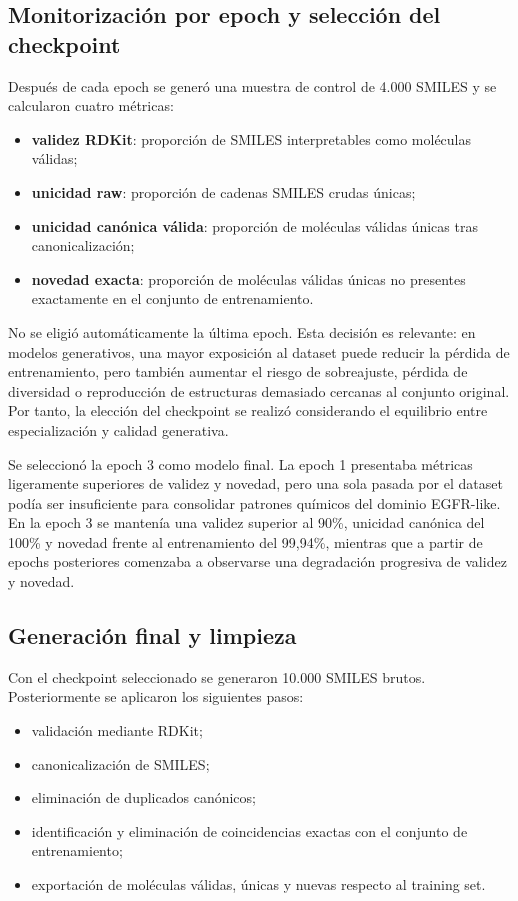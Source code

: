 \documentclass[IB]{TFUOC}%
\begin{document}
\subsection{Monitorización por epoch y selección del checkpoint}

Después de cada epoch se generó una muestra de control de 4.000 SMILES y se calcularon cuatro métricas:

\begin{itemize}
    \item \textbf{validez RDKit}: proporción de SMILES interpretables como moléculas válidas;
    \item \textbf{unicidad raw}: proporción de cadenas SMILES crudas únicas;
    \item \textbf{unicidad canónica válida}: proporción de moléculas válidas únicas tras canonicalización;
    \item \textbf{novedad exacta}: proporción de moléculas válidas únicas no presentes exactamente en el conjunto de entrenamiento.
\end{itemize}

No se eligió automáticamente la última epoch. Esta decisión es relevante: en modelos generativos, una mayor exposición al dataset puede reducir la pérdida de entrenamiento, pero también aumentar el riesgo de sobreajuste, pérdida de diversidad o reproducción de estructuras demasiado cercanas al conjunto original. Por tanto, la elección del checkpoint se realizó considerando el equilibrio entre especialización y calidad generativa.

Se seleccionó la epoch 3 como modelo final. La epoch 1 presentaba métricas ligeramente superiores de validez y novedad, pero una sola pasada por el dataset podía ser insuficiente para consolidar patrones químicos del dominio EGFR-like. En la epoch 3 se mantenía una validez superior al 90\%, unicidad canónica del 100\% y novedad frente al entrenamiento del 99,94\%, mientras que a partir de epochs posteriores comenzaba a observarse una degradación progresiva de validez y novedad.

\subsection{Generación final y limpieza}

Con el checkpoint seleccionado se generaron 10.000 SMILES brutos. Posteriormente se aplicaron los siguientes pasos:

\begin{itemize}
    \item validación mediante RDKit;
    \item canonicalización de SMILES;
    \item eliminación de duplicados canónicos;
    \item identificación y eliminación de coincidencias exactas con el conjunto de entrenamiento;
    \item exportación de moléculas válidas, únicas y nuevas respecto al training set.
\end{itemize}
\end{document}
